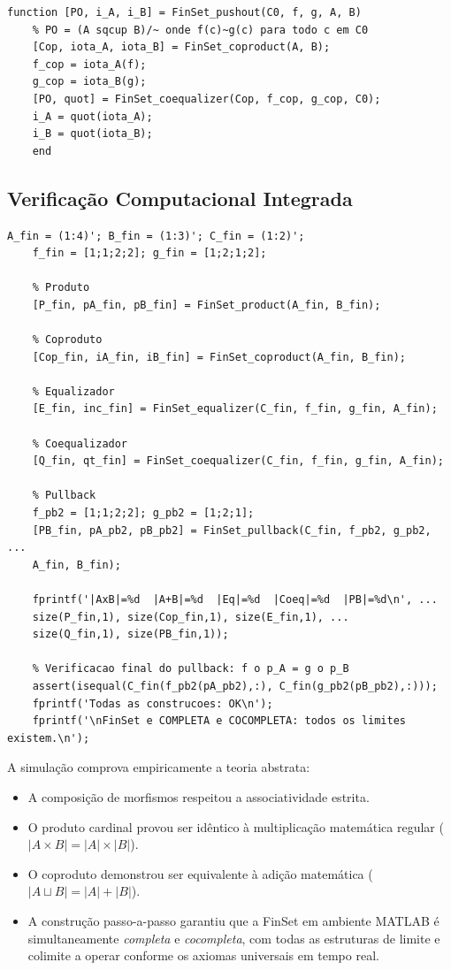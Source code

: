\begin{lstlisting}[style=matlab, caption={Pushout em FinSet (coproduto + coequalizador)}]
	function [PO, i_A, i_B] = FinSet_pushout(C0, f, g, A, B)
	% PO = (A sqcup B)/~ onde f(c)~g(c) para todo c em C0
	[Cop, iota_A, iota_B] = FinSet_coproduct(A, B);
	f_cop = iota_A(f);
	g_cop = iota_B(g);
	[PO, quot] = FinSet_coequalizer(Cop, f_cop, g_cop, C0);
	i_A = quot(iota_A);
	i_B = quot(iota_B);
	end
\end{lstlisting}

\subsection{Verificação Computacional Integrada}

\begin{lstlisting}[style=matlab, caption={Verificação integrada de todas as construções universais}]
	A_fin = (1:4)'; B_fin = (1:3)'; C_fin = (1:2)';
	f_fin = [1;1;2;2]; g_fin = [1;2;1;2];
	
	% Produto
	[P_fin, pA_fin, pB_fin] = FinSet_product(A_fin, B_fin);
	
	% Coproduto
	[Cop_fin, iA_fin, iB_fin] = FinSet_coproduct(A_fin, B_fin);
	
	% Equalizador
	[E_fin, inc_fin] = FinSet_equalizer(C_fin, f_fin, g_fin, A_fin);
	
	% Coequalizador
	[Q_fin, qt_fin] = FinSet_coequalizer(C_fin, f_fin, g_fin, A_fin);
	
	% Pullback
	f_pb2 = [1;1;2;2]; g_pb2 = [1;2;1];
	[PB_fin, pA_pb2, pB_pb2] = FinSet_pullback(C_fin, f_pb2, g_pb2, ...
	A_fin, B_fin);
	
	fprintf('|AxB|=%d  |A+B|=%d  |Eq|=%d  |Coeq|=%d  |PB|=%d\n', ...
	size(P_fin,1), size(Cop_fin,1), size(E_fin,1), ...
	size(Q_fin,1), size(PB_fin,1));
	
	% Verificacao final do pullback: f o p_A = g o p_B
	assert(isequal(C_fin(f_pb2(pA_pb2),:), C_fin(g_pb2(pB_pb2),:)));
	fprintf('Todas as construcoes: OK\n');
	fprintf('\nFinSet e COMPLETA e COCOMPLETA: todos os limites existem.\n');
\end{lstlisting}

A simulação comprova empiricamente a teoria abstrata:
\begin{itemize}
	\item A composição de morfismos respeitou a associatividade
	estrita.
	\item O produto cardinal provou ser idêntico à multiplicação
	matemática regular ($|A \times B| = |A| \times |B|$).
	\item O coproduto demonstrou ser equivalente à adição
	matemática ($|A \sqcup B| = |A| + |B|$).
	\item A construção passo-a-passo garantiu que a FinSet em
	ambiente MATLAB é simultaneamente \textit{completa} e
	\textit{cocompleta}, com todas as estruturas de limite
	e colimite a operar conforme os axiomas universais em
	tempo real.
\end{itemize}

